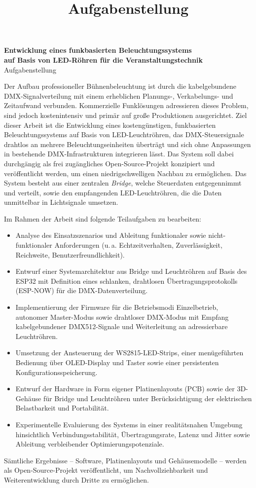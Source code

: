 \documentclass[a4paper,11pt]{article}
\title{Aufgabenstellung}
\author{}
\date{}
\begin{document}
\begin{center}
  {\Large\bfseries Entwicklung eines funkbasierten Beleuchtungssystems\\
  auf Basis von LED-Röhren für die Veranstaltungstechnik}\\[0.5em]
  {\large Aufgabenstellung}
\end{center}

\bigskip

Der Aufbau professioneller Bühnenbeleuchtung ist durch die kabelgebundene
DMX-Signalverteilung mit einem erheblichen Planungs-, Verkabelungs- und
Zeitaufwand verbunden. Kommerzielle Funklösungen adressieren dieses Problem,
sind jedoch kostenintensiv und primär auf große Produktionen ausgerichtet.
Ziel dieser Arbeit ist die Entwicklung eines kostengünstigen, funkbasierten
Beleuchtungssystems auf Basis von LED-Leuchtröhren, das DMX-Steuersignale
drahtlos an mehrere Beleuchtungseinheiten überträgt und sich ohne Anpassungen
in bestehende DMX-Infrastrukturen integrieren lässt. Das System soll dabei
durchgängig als frei zugängliches Open-Source-Projekt konzipiert und
veröffentlicht werden, um einen niedrigschwelligen Nachbau zu ermöglichen.
Das System besteht aus einer zentralen \emph{Bridge}, welche Steuerdaten
entgegennimmt und verteilt, sowie den empfangenden LED-Leuchtröhren, die die
Daten unmittelbar in Lichtsignale umsetzen.

Im Rahmen der Arbeit sind folgende Teilaufgaben zu bearbeiten:

\begin{itemize}
  \item Analyse des Einsatzszenarios und Ableitung funktionaler sowie
        nicht-funktionaler Anforderungen (u.\,a. Echtzeitverhalten,
        Zuverlässigkeit, Reichweite, Benutzerfreundlichkeit).
  \item Entwurf einer Systemarchitektur aus Bridge und Leuchtröhren auf Basis
        des ESP32 mit Definition eines schlanken, drahtlosen
        Übertragungsprotokolls (ESP-NOW) für die DMX-Datenverteilung.
  \item Implementierung der Firmware für die Betriebsmodi Einzelbetrieb,
        autonomer Master-Modus sowie drahtloser DMX-Modus mit Empfang
        kabelgebundener DMX512-Signale und Weiterleitung an adressierbare Leuchtröhren.
  \item Umsetzung der Ansteuerung der WS2815-LED-Strips, einer menügeführten
        Bedienung über OLED-Display und Taster sowie einer persistenten
        Konfigurationsspeicherung.
  \item Entwurf der Hardware in Form eigener Platinenlayouts (PCB) sowie der
        3D-Gehäuse für Bridge und Leuchtröhren unter Berücksichtigung der
        elektrischen Belastbarkeit und Portabilität.
  \item Experimentelle Evaluierung des Systems in einer realitätsnahen
        Umgebung hinsichtlich Verbindungsstabilität, Übertragungsrate, Latenz
        und Jitter sowie Ableitung verbleibender Optimierungspotenziale.
\end{itemize}

Sämtliche Ergebnisse -- Software, Platinenlayouts und Gehäusemodelle -- werden
als Open-Source-Projekt veröffentlicht, um Nachvollziehbarkeit und
Weiterentwicklung durch Dritte zu ermöglichen.
\end{document}
